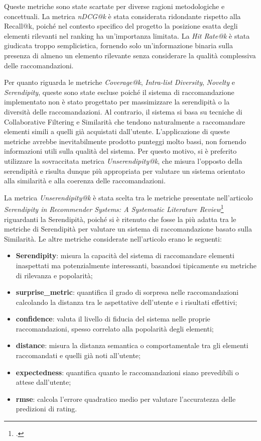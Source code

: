 Queste metriche sono state scartate per diverse ragioni metodologiche e concettuali. La metrica \emph{nDCG@k} è stata considerata ridondante rispetto alla Recall@k, poiché nel contesto specifico del progetto la posizione esatta degli elementi rilevanti nel ranking ha un'importanza limitata. La \emph{Hit Rate@k} è stata giudicata troppo semplicistica, fornendo solo un'informazione binaria sulla presenza di almeno un elemento rilevante senza considerare la qualità complessiva delle raccomandazioni.

Per quanto riguarda le metriche \emph{Coverage@k}, \emph{Intra-list Diversity}, \emph{Novelty} e \emph{Serendipity}, queste sono state escluse poiché il sistema di raccomandazione implementato non è stato progettato per massimizzare la serendipità o la diversità delle raccomandazioni. Al contrario, il sistema si basa su tecniche di Collaborative Filtering e Similarità che tendono naturalmente a raccomandare elementi simili a quelli già acquistati dall'utente. L'applicazione di queste metriche avrebbe inevitabilmente prodotto punteggi molto bassi, non fornendo informazioni utili sulla qualità del sistema. Per questo motivo, si è preferito utilizzare la sovraccitata metrica \emph{Unserendipity@k}, che misura l'opposto della serendipità e risulta dunque più appropriata per valutare un sistema orientato alla similarità e alla coerenza delle raccomandazioni.

La metrica \emph{Unserendipity@k} è stata scelta tra le metriche presentate nell'articolo \emph{Serendipity in Recommender Systems: A Systematic Literature Review}\footcite{article:serendipity-recommender-systems} riguardanti la Serendipità, poiché si è ritenuto che fosse la più adatta tra le metriche di Serendipità per valutare un sistema di raccomandazione basato sulla Similarità.
Le altre metriche considerate nell'articolo erano le seguenti:
\begin{itemize}
    \item \textbf{Serendipity}: misura la capacità del sistema di raccomandare elementi inaspettati ma potenzialmente interessanti, basandosi tipicamente su metriche di rilevanza e popolarità;
    \item \textbf{\gls{surprise_metric}}: quantifica il grado di sorpresa nelle raccomandazioni calcolando la distanza tra le aspettative dell'utente e i risultati effettivi;
    \item \textbf{\gls{confidence}}: valuta il livello di fiducia del sistema nelle proprie raccomandazioni, spesso correlato alla popolarità degli elementi;
    \item \textbf{\gls{distance}}: misura la distanza semantica o comportamentale tra gli elementi raccomandati e quelli già noti all'utente;
    \item \textbf{\gls{expectedness}}: quantifica quanto le raccomandazioni siano prevedibili o attese dall'utente;
    \item \textbf{\gls{rmse}}: calcola l'errore quadratico medio per valutare l'accuratezza delle predizioni di rating.
\end{itemize}

